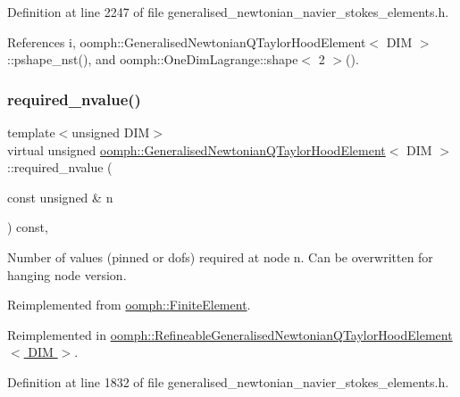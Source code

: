 Definition at line 2247 of file generalised\+\_\+newtonian\+\_\+navier\+\_\+stokes\+\_\+elements.\+h.



References i, oomph\+::\+Generalised\+Newtonian\+Q\+Taylor\+Hood\+Element$<$ D\+I\+M $>$\+::pshape\+\_\+nst(), and oomph\+::\+One\+Dim\+Lagrange\+::shape$<$ 2 $>$().

\mbox{\label{classoomph_1_1GeneralisedNewtonianQTaylorHoodElement_a8da856de8ba84f81516e487b65cc7d9c}} 
\subsubsection{\texorpdfstring{required\+\_\+nvalue()}{required\_nvalue()}}
{\footnotesize\ttfamily template$<$unsigned D\+IM$>$ \\
virtual unsigned \hyperlink{classoomph_1_1GeneralisedNewtonianQTaylorHoodElement}{oomph\+::\+Generalised\+Newtonian\+Q\+Taylor\+Hood\+Element}$<$ D\+IM $>$\+::required\+\_\+nvalue (\begin{DoxyParamCaption}\item[{const unsigned \&}]{n }\end{DoxyParamCaption}) const\hspace{0.3cm}{\ttfamily [inline]}, {\ttfamily [virtual]}}



Number of values (pinned or dofs) required at node n. Can be overwritten for hanging node version. 



Reimplemented from \hyperlink{classoomph_1_1FiniteElement_a56610c60d5bc2d7c27407a1455471b1a}{oomph\+::\+Finite\+Element}.



Reimplemented in \hyperlink{classoomph_1_1RefineableGeneralisedNewtonianQTaylorHoodElement_a9b84c1c9ffa3262c0bb3c4762eebb3f5}{oomph\+::\+Refineable\+Generalised\+Newtonian\+Q\+Taylor\+Hood\+Element$<$ D\+I\+M $>$}.



Definition at line 1832 of file generalised\+\_\+newtonian\+\_\+navier\+\_\+stokes\+\_\+elements.\+h.



